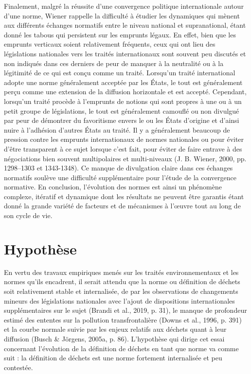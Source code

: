 \documentclass[12pt]{ulaval}
\begin{document}
Finalement, malgré la réussite d'une convergence politique internationale autour d'une norme, Wiener rappelle la difficulté à étudier les dynamiques qui mènent aux différents échanges normatifs entre le niveau national et supranational, étant donné les tabous qui persistent sur les emprunts légaux. En effet, bien que les emprunts verticaux soient relativement fréquents, ceux qui ont lieu des législations nationales vers les traités internationaux sont souvent peu discutés et non indiqués dans ces derniers de peur de manquer à la neutralité ou à la légitimité de ce qui est conçu comme un traité. Lorsqu'un traité international adopte une norme généralement acceptée par les États, le tout est généralement perçu comme une extension de la diffusion horizontale et est accepté. Cependant, lorsqu'un traité procède à l'emprunts de notions qui sont propres à une ou à un petit groupe de législations, le tout est généralement camouflé ou non divulgué par peur de démontrer du favoritisme envers le ou les États d'origine et d'ainsi nuire à l'adhésion d'autres États au traité. Il y a généralement beaucoup de pression contre les emprunts internationaux de normes nationales ou pour éviter d'être transparent à ce sujet lorsque c'est fait, pour éviter de faire entrave à des négociations bien souvent multipolaires et multi-niveaux (J. B. Wiener, 2000, pp. 1298--1303 et 1343-1348). Ce manque de divulgation claire dans ces échanges normatifs soulève une difficulté supplémentaire pour l'étude de la convergence normative. En conclusion, l'évolution des normes est ainsi un phénomène complexe, itératif et dynamique dont les résultats ne peuvent être garantis étant donné la grande variété de facteurs et de mécanismes à l'œuvre tout au long de son cycle de vie.

\section{Hypothèse}\label{hypothuxe8se}

En vertu des travaux empiriques menés sur les traités environnementaux et les normes qu'ils encadrent, il serait attendu que la norme ou définition de déchets soit relativement stable et internalisée, de par les observations de changements mineurs des législations nationales avec l'ajout de dispositions internationales supplémentaires sur le sujet (Brandi et al., 2019, p. 31), le manque de profondeur estimé des ententes sur la pollution transfrontalière (Downs et al., 1996, p. 391) et la courbe normale suivie par les enjeux relatifs aux déchets quant à leur diffusion (Busch \& Jörgens, 2005a, p. 86). L'hypothèse qui dirige cet essai concernant l'évolution de la définition de déchets en tant que norme va comme suit : la définition de déchets est une norme fortement internalisée et peu contestée.
\end{document}

